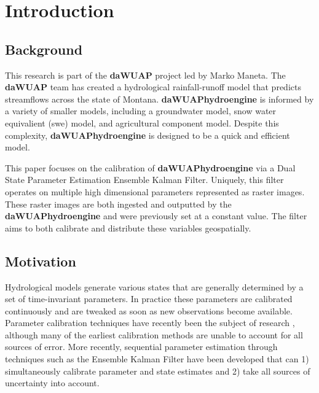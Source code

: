 \chapter{Introduction}

\section{Background}

This research is part of the \textbf{daWUAP} project led by Marko Maneta. The \textbf{daWUAP} team has created a hydrological rainfall-runoff model that predicts streamflows across the state of Montana. \textbf{daWUAPhydroengine} is informed by a variety of smaller models, including a groundwater model, snow water equivalient (swe) model, and agricultural component model. Despite this complexity, \textbf{daWUAPhydroengine} is designed to be a quick and efficient model.

This paper focuses on the calibration of \textbf{daWUAPhydroengine} via a Dual State Parameter Estimation Ensemble Kalman Filter. Uniquely, this filter operates on multiple high dimensional parameters represented as raster images. These raster images are both ingested and outputted by the \textbf{daWUAPhydroengine} and were previously set at a constant value. The filter aims to both calibrate and distribute these variables geospatially. 

\section{Motivation}
\label{ch1:opts}

Hydrological models generate various states that are generally determined by a set of time-invariant parameters\cite{Moradkhani2005}. In practice these parameters are calibrated continuously and are tweaked as soon as new observations become available. Parameter calibration techniques have recently been the subject of research \cite{Xie2010} \cite{Sorooshian1993}, although many of the earliest calibration methods are unable to account for all sources of error\cite{Evensen1994}. More recently, sequential parameter estimation through techniques such as the Ensemble Kalman Filter have been developed that can 1) simultaneously calibrate parameter and state estimates and 2) take all sources of uncertainty into account\cite{Evensen2003}.

